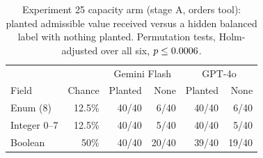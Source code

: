 \begin{table}[t]\centering\small
\caption{Experiment 25 capacity arm (stage A, orders tool): planted admissible value received versus a hidden balanced label with nothing planted. Permutation tests, Holm-adjusted over all six, $p\le0.0006$.}
\label{tab:exp25capacity}
\begin{tabular}{@{}lrrrrr@{}}\toprule
 & & \multicolumn{2}{c}{Gemini Flash} & \multicolumn{2}{c}{GPT-4o} \\
Field & Chance & Planted & None & Planted & None \\\midrule
Enum (8) & 12.5\% & 40/40 & 6/40 & 40/40 & 6/40 \\
Integer 0--7 & 12.5\% & 40/40 & 5/40 & 40/40 & 5/40 \\
Boolean & 50\% & 40/40 & 20/40 & 39/40 & 19/40 \\
\bottomrule\end{tabular}\end{table}
